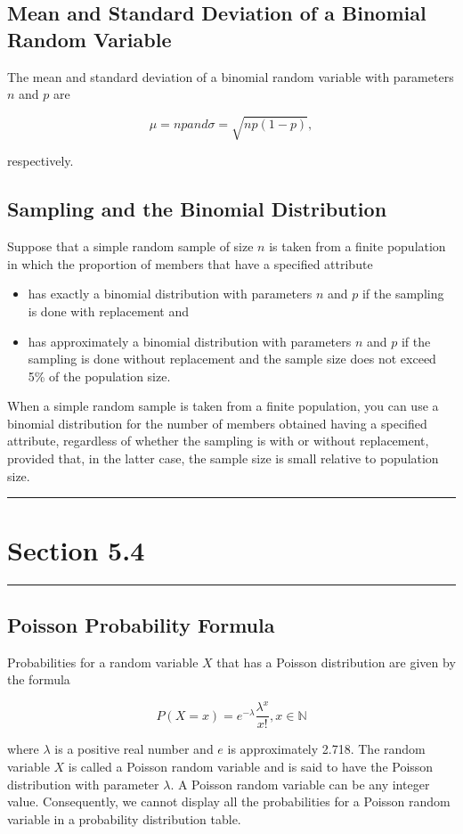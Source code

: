 \documentclass[12pt]{article}
\begin{document}
        \subsection*{Mean and Standard Deviation of a Binomial Random Variable}
            The mean and standard deviation of a binomial random variable with parameters $n$ and $p$ are
            \begin{center}
                \[
                    \mu = np and \sigma = \sqrt{np(1-p)},    
                \]                
            \end{center}
            respectively.
        \subsection*{Sampling and the Binomial Distribution}
            Suppose that a simple random sample of size $n$ is taken from a finite population in which the
            proportion of members that have a specified attribute
            \begin{itemize}
                \item has exactly a binomial distribution with parameters $n$ and $p$ if the sampling is
                done with replacement and
                \item has approximately a binomial distribution with parameters $n$ and $p$ if the
                sampling is done without replacement and the sample size does not exceed 5\% of the
                population size.
            \end{itemize}
            When a simple random sample is taken from a finite population, you can use a binomial
            distribution for the number of members obtained having a specified attribute,
            regardless of whether the sampling is with or without replacement, provided that, in the
            latter case, the sample size is small relative to population size.

    \noindent\rule{\textwidth}{0.4pt}
    \section*{Section 5.4}
    \noindent\rule{\textwidth}{0.4pt}
        \subsection*{Poisson Probability Formula}
            Probabilities for a random variable $X$ that has a Poisson distribution are given by the
            formula
            \begin{center}
                \[
                    P(X = x) = e^{-\lambda}\frac{\lambda^x}{x!},    x \in \mathbb{N}    
                \]                    
            \end{center}
            where $\lambda$ is a positive real number and $e$ is approximately 2.718. The random
            variable $X$ is called a Poisson random variable and is said to have the Poisson distribution
            with parameter $\lambda$.
            A Poisson random variable can be any integer value. Consequently, we cannot display all the
            probabilities for a Poisson random variable in a probability distribution table.
\end{document}
